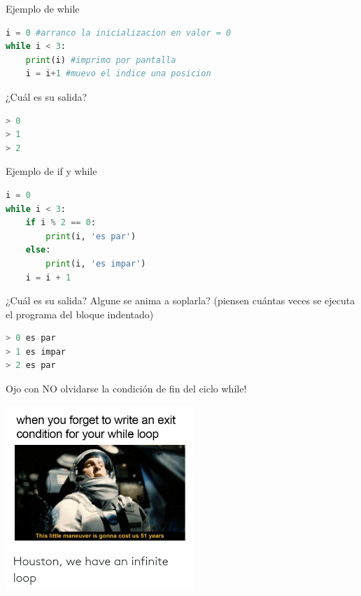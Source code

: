 \documentclass{beamer}
\begin{document}
\begin{frame}[fragile]{Ejemplo de while}
\begin{lstlisting}[language=Python]
i = 0 #arranco la inicializacion en valor = 0
while i < 3:
    print(i) #imprimo por pantalla
    i = i+1 #muevo el indice una posicion
\end{lstlisting} \pause

¿Cuál es su salida? \pause 
\begin{lstlisting}[language=Python]
> 0 
> 1
> 2
\end{lstlisting}
\end{frame}

\begin{frame}[fragile]{Ejemplo de if y while}
\begin{lstlisting}[language=Python]
i = 0
while i < 3:
    if i % 2 == 0:
        print(i, 'es par')
    else:
        print(i, 'es impar')
    i = i + 1

\end{lstlisting} \pause

¿Cuál es su salida? Algune se anima a soplarla? (piensen cuántas veces se ejecuta el programa del bloque indentado) \pause 
\begin{lstlisting}[language=Python]
> 0 es par
> 1 es impar
> 2 es par
\end{lstlisting}
\end{frame}

\begin{frame}{Ojo con NO olvidarse la condición de fin del ciclo while!} \pause
\begin{center}
\includegraphics[height=7cm, scale=1]{recursos/infinite_loop.png}
\end{center}
\end{frame}
\end{document}
